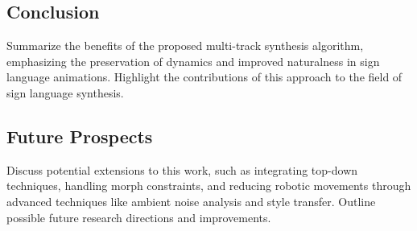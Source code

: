 \documentclass[../../main.tex]{subfiles}
\begin{document}
\subsection{Conclusion}
Summarize the benefits of the proposed multi-track synthesis algorithm, emphasizing the preservation of dynamics and improved naturalness in sign language animations. Highlight the contributions of this approach to the field of sign language synthesis.

\subsection{Future Prospects}
Discuss potential extensions to this work, such as integrating top-down techniques, handling morph constraints, and reducing robotic movements through advanced techniques like ambient noise analysis and style transfer. Outline possible future research directions and improvements.
\end{document}
